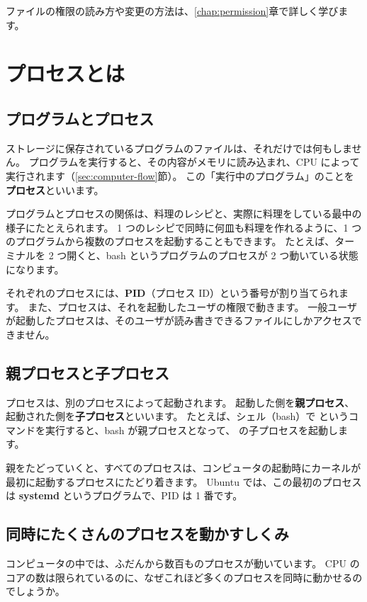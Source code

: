 ファイルの権限の読み方や変更の方法は、\ref{chap:permission}章で詳しく学びます。

\section{プロセスとは}
\label{sec:linux-internals-process}

\subsection{プログラムとプロセス}

ストレージに保存されているプログラムのファイルは、それだけでは何もしません。
プログラムを実行すると、その内容がメモリに読み込まれ、CPU によって実行されます（\ref{sec:computer-flow}節）。
この「実行中のプログラム」のことを\textbf{プロセス}といいます。

プログラムとプロセスの関係は、料理のレシピと、実際に料理をしている最中の様子にたとえられます。
1 つのレシピで同時に何皿も料理を作れるように、1 つのプログラムから複数のプロセスを起動することもできます。
たとえば、ターミナルを 2 つ開くと、bash というプログラムのプロセスが 2 つ動いている状態になります。

それぞれのプロセスには、\textbf{PID}（プロセス ID）という番号が割り当てられます。
また、プロセスは、それを起動したユーザの権限で動きます。
一般ユーザが起動したプロセスは、そのユーザが読み書きできるファイルにしかアクセスできません。

\subsection{親プロセスと子プロセス}

プロセスは、別のプロセスによって起動されます。
起動した側を\textbf{親プロセス}、起動された側を\textbf{子プロセス}といいます。
たとえば、シェル（bash）で  というコマンドを実行すると、bash が親プロセスとなって、 の子プロセスを起動します。

親をたどっていくと、すべてのプロセスは、コンピュータの起動時にカーネルが最初に起動するプロセスにたどり着きます。
Ubuntu では、この最初のプロセスは \textbf{systemd} というプログラムで、PID は 1 番です。

\subsection{同時にたくさんのプロセスを動かすしくみ}

コンピュータの中では、ふだんから数百ものプロセスが動いています。
CPU のコアの数は限られているのに、なぜこれほど多くのプロセスを同時に動かせるのでしょうか。

